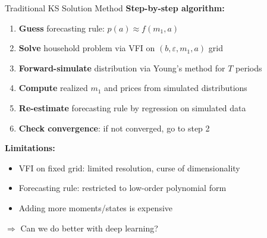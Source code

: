\documentclass[aspectratio=169,11pt]{beamer}
\newcommand{\emphc}[1]{\textcolor{harvardcrimson}{#1}}
\begin{document}
\begin{frame}{Traditional KS Solution Method}
\textbf{Step-by-step algorithm:}
\begin{enumerate}
    \item \textbf{Guess} forecasting rule: $p(a) \approx f(m_1, a)$
    \item \textbf{Solve} household problem via VFI on $(b, \varepsilon, m_1, a)$ grid
    \item \textbf{Forward-simulate} distribution via Young's method for $T$ periods
    \item \textbf{Compute} realized $m_1$ and prices from simulated distributions
    \item \textbf{Re-estimate} forecasting rule by regression on simulated data
    \item \textbf{Check convergence}: if not converged, go to step 2
\end{enumerate}

\vspace{0.5em}
\textbf{Limitations:}
\begin{itemize}
    \item VFI on fixed grid: limited resolution, curse of dimensionality
    \item Forecasting rule: restricted to low-order polynomial form
    \item Adding more moments/states is expensive
\end{itemize}

\vspace{0.3em}
$\Rightarrow$ \emphc{Can we do better with deep learning?}
\end{frame}
\end{document}
